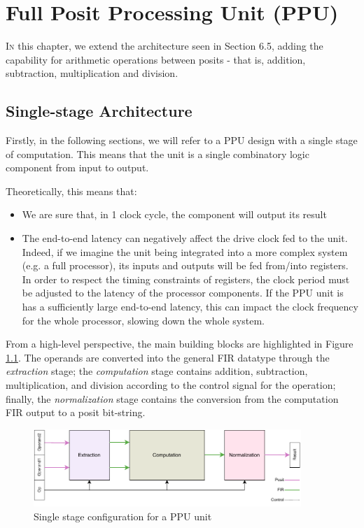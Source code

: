 \chapter{Full Posit Processing Unit (PPU)}\label{chap:posit_fullppu}

\lettrine{I}{n} this chapter, we extend the architecture seen in Section 6.5, adding the capability for arithmetic operations between posits - that is, addition, subtraction, multiplication and division.



\section{Single-stage Architecture}

Firstly, in the following sections, we will refer to a PPU design with a single stage of computation. This means that the unit is a single combinatory logic component from input to output.

Theoretically, this means that:
\begin{itemize}
    \item We are sure that, in 1 clock cycle, the component will output its result
    \item The end-to-end latency can negatively affect the drive clock fed to the unit. Indeed, if we imagine the unit being integrated into a more complex system (e.g. a full processor), its inputs and outputs will be fed from/into registers. In order to respect the timing constraints of registers, the clock period must be adjusted to the latency of the processor components. If the PPU unit is has a sufficiently large end-to-end latency, this can impact the clock frequency for the whole processor, slowing down the whole system.
\end{itemize}

From a high-level perspective, the main building blocks are highlighted in Figure \ref{fig:overview_ppu}.
The operands are converted into the general FIR datatype through the \textit{extraction} stage; the \textit{computation} stage contains addition, subtraction, multiplication, and division according to the control signal for the operation; finally, the \textit{normalization} stage contains the conversion from the computation FIR output to a posit bit-string.

\begin{figure}
    \begin{center}
    \includegraphics[width=0.9\textwidth]{figures/top.pdf}
    \caption{Single stage configuration for a PPU unit}
    \label{fig:overview_ppu}
    \end{center}
\end{figure}

